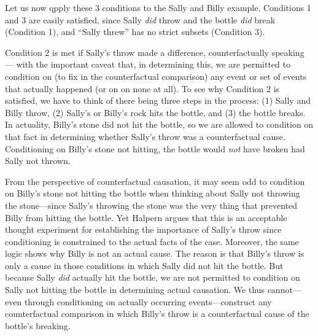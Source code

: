 \documentclass[
  12pt,
]{book}
\begin{document}
Let us now qpply these 3 conditions to the Sally and Billy example. Conditions 1 and 3 are easily satisfied, since Sally \emph{did} throw and the bottle \emph{did} break (Condition 1), and ``Sally threw'' has no strict subsets (Condition 3).

Condition 2 is met if Sally's throw made a difference, counterfactually speaking --- with the important caveat that, in determining this, we are permitted to condition on (to fix in the counterfactual comparison) any event or set of events that actually happened (or on on none at all). To see why Condition 2 is satisfied, we have to think of there being three steps in the process: (1) Sally and Billy throw, (2) Sally's or Billy's rock hits the bottle, and (3) the bottle breaks. In actuality, Billy's stone did not hit the bottle, so we are allowed to condition on that fact in determining whether Sally's throw was a counterfactual cause. Conditioning on Billy's stone not hitting, the bottle would \emph{not} have broken had Sally not thrown.

From the perspective of counterfactual causation, it may seem odd to condition on Billy's stone not hitting the bottle when thinking about Sally not throwing the stone---since Sally's throwing the stone was the very thing that prevented Billy from hitting the bottle. Yet Halpern argues that this is an acceptable thought experiment for establishing the importance of Sally's throw since conditioning is constrained to the actual facts of the case. Moreover, the same logic shows why Billy is not an actual cause. The reason is that Billy's throw is only a cause in those conditions in which Sally did not hit the bottle. But because Sally \emph{did} actually hit the bottle, we are not permitted to condition on Sally not hitting the bottle in determining actual causation. We thus cannot---even through conditioning on actually occurring events---construct any counterfactual comparison in which Billy's throw is a counterfactual cause of the bottle's breaking.
\end{document}

